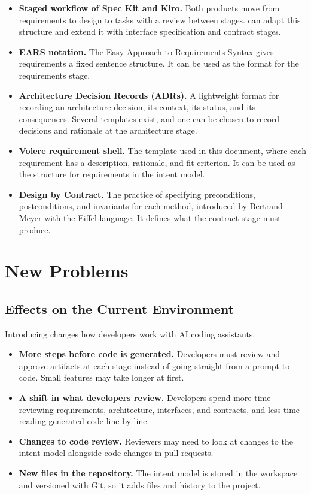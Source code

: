 \documentclass[12pt]{article}
\begin{document}
\begin{itemize}
  \item \textbf{Staged workflow of Spec Kit and Kiro.} Both products move from
  requirements to design to tasks with a review between stages. \progname{} can
  adapt this structure and extend it with interface specification and contract
  stages.
  \item \textbf{EARS notation.} The Easy Approach to Requirements Syntax gives
  requirements a fixed sentence structure. It can be used as the format for the
  requirements stage.
  \item \textbf{Architecture Decision Records (ADRs).} A lightweight format for
  recording an architecture decision, its context, its status, and its
  consequences. Several templates exist, and one can be chosen to record
  decisions and rationale at the architecture stage.
  \item \textbf{Volere requirement shell.} The template used in this document,
  where each requirement has a description, rationale, and fit criterion. It
  can be used as the structure for requirements in the intent model.
  \item \textbf{Design by Contract.} The practice of specifying preconditions,
  postconditions, and invariants for each method, introduced by Bertrand Meyer
  with the Eiffel language. It defines what the contract stage must produce.
\end{itemize}

\section{New Problems}
\subsection{Effects on the Current Environment}

Introducing \progname{} changes how developers work with AI coding assistants.

\begin{itemize}
  \item \textbf{More steps before code is generated.} Developers must review
  and approve artifacts at each stage instead of going straight from a prompt
  to code. Small features may take longer at first.
  \item \textbf{A shift in what developers review.} Developers spend more time
  reviewing requirements, architecture, interfaces, and contracts, and less
  time reading generated code line by line.
  \item \textbf{Changes to code review.} Reviewers may need to look at changes
  to the intent model alongside code changes in pull requests.
  \item \textbf{New files in the repository.} The intent model is stored in the
  workspace and versioned with Git, so it adds files and history to the
  project.
\end{itemize}
\end{document}
